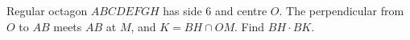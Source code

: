 Regular octagon $ABCDEFGH$ has side 6 and centre $O$. The perpendicular from $O$ to $AB$ meets $AB$ at $M$, and $K=BH\cap OM$. Find $BH\cdot BK$.
